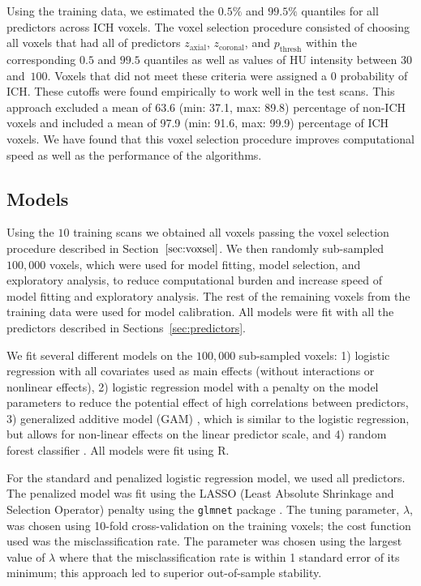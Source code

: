 \documentclass{elsarticle_nonatbib}\usepackage[]{graphicx}\usepackage[]{color}
\newcommand{\pkg}[1]{\texttt{#1}}
\begin{document}
Using the training data, we estimated the $0.5\%$ and $99.5\%$ quantiles for all predictors across ICH voxels. The voxel selection procedure consisted of choosing all voxels that had all of predictors $z_{\text{axial}}$, $z_{\text{coronal}}$, and $p_{\text{thresh}}$ within the corresponding $0.5$ and $99.5$ quantiles as well as values of HU intensity between $30$ and~$100$. Voxels that did not meet these criteria were assigned a $0$ probability of ICH. These cutoffs were found empirically to work well in the test scans. This approach excluded a mean of  63.6 (min: 37.1, max: 89.8) percentage of non-ICH voxels and included a mean of 97.9 (min: 91.6, max: 99.9) percentage of ICH voxels.  We have found that this voxel selection procedure improves computational speed as well as the performance of the algorithms.

\subsection{Models}
\label{sec:mods}
Using the $10$ training scans we obtained all voxels passing the voxel selection procedure described in Section~$\ref{sec:voxsel}$.  We then randomly sub-sampled $100{,}000$ voxels, which were used for model fitting, model selection, and exploratory analysis, to reduce computational burden and increase speed of model fitting and exploratory analysis.  The rest of the remaining voxels from the training data were used for model calibration.   All models were fit with all the predictors described in Sections~\ref{sec:predictors}.


We fit several different models on the $100{,}000$ sub-sampled voxels: 1) logistic regression with all covariates used as main effects (without interactions or nonlinear effects), 2) logistic regression model with a penalty on the model parameters to reduce the potential effect of high correlations between predictors, 3) generalized additive model (GAM) \citep{hastie_generalized_1986, hastie_generalized_1990}, which is similar to the logistic regression, but allows for non-linear effects on the linear predictor scale, and 4) random forest classifier \citep{breiman2001random}.  All models were fit using R.

For the standard and penalized logistic regression model, we used all predictors.  The penalized model was fit using the LASSO (Least Absolute Shrinkage and Selection Operator) penalty \citep{tibshirani_regression_1996} using the \pkg{glmnet} package \citep{friedman_regularization_2010}.  The tuning parameter, $\lambda$, was chosen using 10-fold cross-validation on the training voxels; the cost function used was the misclassification rate.  The parameter was chosen using the largest value of $\lambda$ where that the misclassification rate is within 1 standard error of its minimum; this approach led to superior out-of-sample stability.
\end{document}
